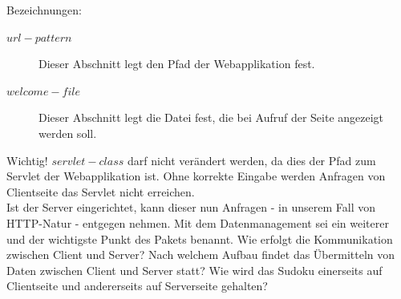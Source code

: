\documentclass[a4paper,12pt]{scrreprt}
\begin{document}
	Bezeichnungen:
	\begin{description}
		\item[$url-pattern$] Dieser Abschnitt legt den Pfad der Webapplikation fest.
		\item[$welcome-file$] Dieser Abschnitt legt die Datei fest, die bei Aufruf der Seite angezeigt werden soll.
	\end{description}
	Wichtig! $servlet-class$ darf nicht ver\"andert werden, da dies der Pfad zum Servlet der Webapplikation ist.
	Ohne korrekte Eingabe werden Anfragen von Clientseite das Servlet nicht erreichen.\smallskip \\
	Ist der Server eingerichtet, kann dieser nun Anfragen - in unserem Fall von HTTP-Natur - entgegen
	nehmen. Mit dem Datenmanagement sei ein weiterer und der wichtigste Punkt des Pakets benannt.
	Wie erfolgt die Kommunikation zwischen Client und Server? Nach welchem Aufbau findet das
	\"Ubermitteln von Daten zwischen Client und Server statt? Wie wird das Sudoku einerseits auf
	Clientseite und andererseits auf Serverseite gehalten?
\end{document}
